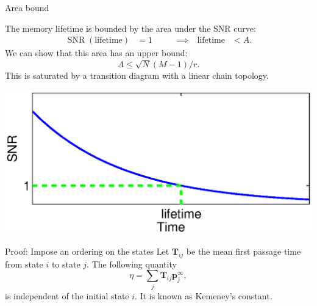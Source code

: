 \documentclass[final,hyperref={pdfpagelabels=false,bookmarks=false}]{beamer}
\DeclareMathOperator{\SNR}{SNR}
\newcommand{\eq}{\mathbf{p}^\infty}
\newcommand{\fpt}{\mathbf{T}}
\begin{document}
\begin{frame}{}
\begin{columns}[t]
\begin{column}{0.37\linewidth}
\begin{block}{Area bound}
%
 \parbox[c]{26cm}{
  The memory lifetime is bounded by the area under the SNR curve:
  \begin{equation*}
  \begin{aligned}
    \SNR(\text{lifetime})&=1
    &\qquad
    \implies
    \quad
    \text{lifetime} &< A.
  \end{aligned}
  \end{equation*}
  We can show that this area has an upper bound:
  \begin{equation*}
    A \leq \sqrt{N}(M-1)/r.
  \end{equation*}
  This is saturated by a transition diagram with a linear chain topology.
 }
 \hfill
 \parbox[c]{16cm}{
  \begin{center}
    \includegraphics[width=15cm]{lifetime.eps}
  \end{center}
 }
%
\end{block}


\begin{block}{Proof: Impose an ordering on the states}
%
 Let $\fpt_{ij}$ be the mean first passage time from state $i$ to state $j$.
 The following quantity
 \begin{equation*}
   \eta = \sum_j \fpt_{ij} \eq_j,
 \end{equation*}
 is independent of the initial state $i$.
 It is known as Kemeney's constant. 


\end{block}
\end{column}
\end{columns}
\end{frame}
\end{document}
